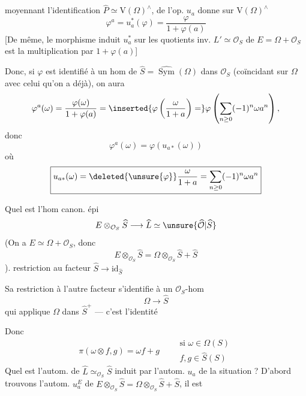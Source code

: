 moyennant l'identification $\widehat P\simeq\mathrm{V}(\Omega)^\wedge$,  de l'op. $u_a$ donne sur $\mathrm{V}(\Omega)^\wedge$
\[
\varphi^a=u_a^*(\varphi)=\frac{\varphi}{1+\varphi(a)}
\]
[De même, le morphisme induit $u_a^*$ sur les quotients inv. $L'\simeq\mathcal{O}_S$  de $E=\Omega+\mathcal{O}_S$ est la multiplication par $1+\varphi(a)$]

Donc,  si $\varphi$ est identifié à un hom de $\widehat S=\widehat{\operatorname{Sym}}(\Omega)$ dans $\mathcal{O}_S$ (coïncidant sur $\Omega$ avec celui qu'on a déjà), on aura
\[
\varphi^a(\omega)=\frac{\varphi(\omega)}{1+\varphi(a)}=
\inserted{\varphi\left(\frac{\omega}{1+a}\right)=}
\varphi\left(\sum_{n\geq0}(-1)^n\omega a^n\right),
\]
donc
\[
\varphi^a(\omega)=\varphi(u_{a*}(\omega))
\]
où
\[
\boxed{u_{a*}(\omega)=\deleted{\unsure{\varphi}}\frac{\omega}{1+a}=\sum_{n\geq0}(-1)^n\omega a^n}
\]

Quel est l'hom canon. épi
\[
E\otimes_{\mathcal{O}_S}\widehat S\longrightarrow\widehat L\simeq\unsure{\widehat{\mathcal{O}}|\widehat S}
\]
(On a $E\simeq\Omega+\mathcal{O}_S$, donc
\[
E\otimes_{\mathcal{O}_S}\widehat S=\Omega\otimes_{\mathcal{O}_S}\widehat S+\widehat S
\]
).
 restriction au facteur $\widehat S\longrightarrow\mathrm{id}_{\widehat S}$

Sa restriction à l'autre facteur s'identifie à un $\mathcal{O}_S$-hom
\[
\Omega\longrightarrow\widehat S
\]
qui applique $\Omega$ dans $\widehat S^+$ --- c'est l'identité

Donc
\[
\pi(\omega\otimes f,g)=\omega f+g\qquad
\begin{gathered}\text{si }\omega\in\Omega(S)\\f,g\in\widehat S(S)\end{gathered}
\]
Quel est l'autom. de $\widehat L\simeq_{\mathcal{O}_S}\widehat S$ induit par l'autom. $u_a$ de la situation ? D'abord trouvons l'autom. $u_a^E$ de $E\otimes_{\mathcal{O}_S}\widehat S=\Omega\otimes_{\mathcal{O}_S}\widehat S+\widehat S$, il est 

